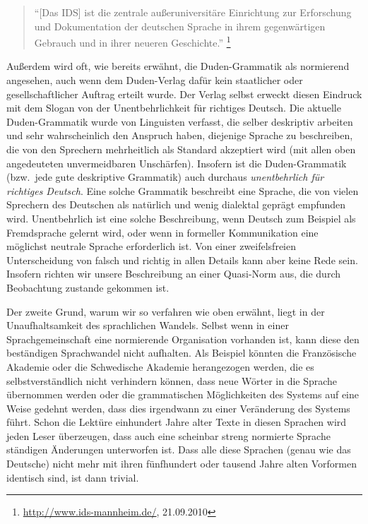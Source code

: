 \begin{quote}
  "`[Das IDS] ist die zentrale außeruniversitäre Einrichtung zur Erforschung und Dokumentation der deutschen Sprache in ihrem gegenwärtigen Gebrauch und in ihrer neueren Geschichte."'%
    \footnote{\raggedright{\url{http://www.ids-mannheim.de/}, 21.09.2010}}
\end{quote}

Außerdem wird oft, wie bereits erwähnt, die Duden-Grammatik als normierend angesehen, auch wenn dem Duden-Verlag dafür kein staatlicher oder gesellschaftlicher Auftrag erteilt wurde.
Der Verlag selbst erweckt diesen Eindruck mit dem Slogan von der Unentbehrlichkeit für richtiges Deutsch.
Die aktuelle Duden-Grammatik wurde von Linguisten verfasst, die selber deskriptiv arbeiten und sehr wahrscheinlich den Anspruch haben, diejenige Sprache zu beschreiben, die von den Sprechern mehrheitlich als Standard akzeptiert wird (mit allen oben angedeuteten unvermeidbaren Unschärfen).
Insofern ist die Duden-Grammatik (bzw.\ jede gute deskriptive Grammatik) auch durchaus \textit{unentbehrlich für richtiges Deutsch}.
Eine solche Grammatik beschreibt eine Sprache, die von vielen Sprechern des Deutschen als natürlich und wenig dialektal geprägt empfunden wird.
Unentbehrlich ist eine solche Beschreibung, wenn Deutsch zum Beispiel als Fremdsprache gelernt wird, oder wenn in formeller Kommunikation eine möglichst neutrale Sprache erforderlich ist.
Von einer zweifelsfreien Unterscheidung von falsch und richtig in allen Details kann aber keine Rede sein.
Insofern richten wir unsere Beschreibung an einer Quasi-Norm aus, die durch Beobachtung zustande gekommen ist.

Der zweite Grund, warum wir so verfahren wie oben erwähnt, liegt in der Unaufhaltsamkeit des sprachlichen Wandels.
Selbst wenn in einer Sprachgemeinschaft eine normierende Organisation vorhanden ist, kann diese den beständigen Sprachwandel nicht aufhalten.
Als Beispiel könnten die Französische Akademie oder die Schwedische Akademie herangezogen werden, die es selbstverständlich nicht verhindern können, dass \zB neue Wörter in die Sprache übernommen werden oder die grammatischen Möglichkeiten des Systems auf eine Weise gedehnt werden, dass dies irgendwann zu einer Veränderung des Systems führt.
Schon die Lektüre einhundert Jahre alter Texte in diesen Sprachen wird jeden Leser überzeugen, dass auch eine scheinbar streng normierte Sprache ständigen Änderungen unterworfen ist.
Dass alle diese Sprachen (genau wie das Deutsche) nicht mehr mit ihren fünfhundert oder tausend Jahre alten Vorformen identisch sind, ist dann trivial.

